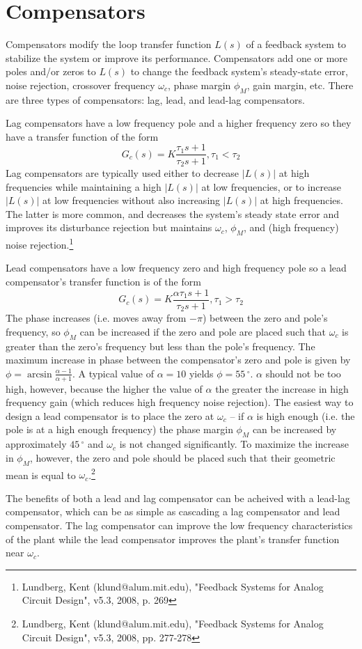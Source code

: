 \chapter{Compensators}
Compensators modify the loop transfer function $L(s)$ of a feedback system to stabilize the system or improve its performance. Compensators add one or more poles and/or zeros to $L(s)$ to change the feedback system's steady-state error, noise rejection, crossover frequency $\omega_{c}$, phase margin $\phi_{M}$, gain margin, etc. There are three types of compensators: lag, lead, and lead-lag compensators.
\par
Lag compensators have a low frequency pole and a higher frequency zero so they have a transfer function of the form \[G_{c}(s) = K\frac{\tau_{1}s+1}{\tau_{2}s+1}, \tau_{1} < \tau_{2}\]
Lag compensators are typically used either to decrease $|L(s)|$ at high frequencies while maintaining a high $|L(s)|$ at low frequencies, or to increase $|L(s)|$ at low frequencies without also increasing $|L(s)|$ at high frequencies. The latter is more common, and decreases the system's steady state error and improves its disturbance rejection but maintains $\omega_{c}$, $\phi_{M}$, and (high frequency) noise rejection.\footnote{Lundberg, Kent (klund@alum.mit.edu), "Feedback Systems for Analog Circuit Design", v5.3, 2008, p. 269}
\par
Lead compensators have a low frequency zero and high frequency pole so a lead compensator's transfer function is of the form \[G_{c}(s) = K\frac{\alpha \tau_{1}s+1}{\tau_{2}s+1}, \tau_{1} > \tau_{2}\]
The phase increases (i.e. moves away from $-\pi$) between the zero and pole's frequency, so $\phi_{M}$ can be increased if the zero and pole are placed such that $\omega_{c}$ is greater than the zero's frequency but less than the pole's frequency. The maximum increase in phase between the compensator's zero and pole is given by $\phi = \arcsin \frac{\alpha - 1}{\alpha + 1}$. A typical value of $\alpha = 10$ yields $\phi = 55\,^{\circ}$. $\alpha$ should not be too high, however, because the higher the value of $\alpha$ the greater the increase in high frequency gain (which reduces high frequency noise rejection). The easiest way to design a lead compensator is to place the zero at $\omega_{c}$ -- if $\alpha$ is high enough (i.e. the pole is at a high enough frequency) the phase margin $\phi_{M}$ can be increased by approximately $45\,^{\circ}$ and $\omega_{c}$ is not changed significantly. To maximize the increase in $\phi_{M}$, however, the zero and pole should be placed such that their geometric mean is equal to $\omega_{c}$.\footnote{Lundberg, Kent (klund@alum.mit.edu), "Feedback Systems for Analog Circuit Design", v5.3, 2008, pp. 277-278}
\par
The benefits of both a lead and lag compensator can be acheived with a lead-lag compensator, which can be as simple as cascading a lag compensator and lead compensator. The lag compensator can improve the low frequency characteristics of the plant while the lead compensator improves the plant's transfer function near $\omega_{c}$.


